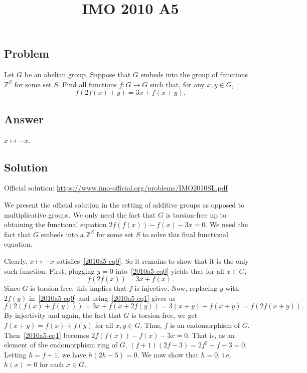\documentclass{article}
\title{IMO 2010 A5}
\author{}
\date{}
\newcommand{\Z}{\mathbb{Z}}
\begin{document}
\maketitle



\subsection*{Problem}

Let $G$ be an abelian group.
Suppose that $G$ embeds into the group of functions $\Z^S$ for some set $S$.
Find all functions $f : G \to G$ such that, for any $x, y \in G$,
\[ f(2 f(x) + y) = 3x + f(x + y). \tag{*}\label{2010a5-eq0} \]



\subsection*{Answer}

$x \mapsto -x$.



\subsection*{Solution}

Official solution: \url{https://www.imo-official.org/problems/IMO2010SL.pdf}

We present the official solution in the setting of additive groups as opposed to multiplicative groups.
We only need the fact that $G$ is torsion-free up to obtaining the functional equation $2 f(f(x)) - f(x) - 3x = 0$.
We need the fact that $G$ embeds into a $\Z^S$ for some set $S$ to solve this final functional equation. 

Clearly, $x \mapsto -x$ satisfies~\eqref{2010a5-eq0}.
So it remains to show that it is the only such function.
First, plugging $y = 0$ into~\eqref{2010a5-eq0} yields that for all $x \in G$,
\[ f(2 f(x)) = 3x + f(x). \tag{1}\label{2010a5-eq1} \]
Since $G$ is torsion-free, this implies that $f$ is injective.
Now, replacing $y$ with $2 f(y)$ in~\eqref{2010a5-eq0} and using~\eqref{2010a5-eq1} gives us
\[ f(2 (f(x) + f(y))) = 3x + f(x + 2 f(y)) = 3(x + y) + f(x + y) = f(2 f(x + y)). \]
By injectivity and again, the fact that $G$ is torsion-free, we get $f(x + y) = f(x) + f(y)$ for all $x, y \in G$.
Thus, $f$ is an endomorphism of $G$.
Then~\eqref{2010a5-eq1} becomes $2 f(f(x)) - f(x) - 3x = 0$.
That is, as an element of the endomorphism ring of $G$, $(f + 1)(2f - 3) = 2 f^2 - f - 3 = 0$.
Letting $h = f + 1$, we have $h(2h - 5) = 0$.
We now show that $h = 0$, i.e. $h(x) = 0$ for each $x \in G$.
\end{document}
